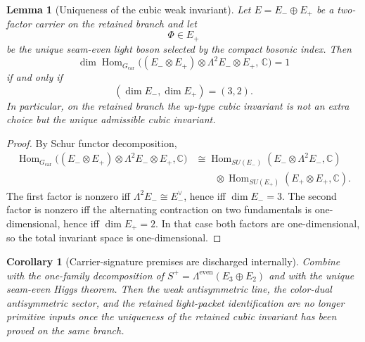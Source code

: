 \documentclass[11pt,a4paper]{article}
\newtheorem{corollary}[theorem]{Corollary}
\newtheorem{lemma}[theorem]{Lemma}
\theoremstyle{definition}
\theoremstyle{remark}
\begin{document}
\begin{lemma}[Uniqueness of the cubic weak invariant]
\label{lem:unique-cubic-weak-invariant}
Let $E=E_-\oplus E_+$ be a two-factor carrier on the retained branch and let
\[
\Phi\in E_+
\]
be the unique seam-even light boson selected by the compact bosonic index. Then
\[
\dim \operatorname{Hom}_{G_{\mathrm{car}}}\bigl((E_-\otimes E_+)\otimes \Lambda^2 E_-\otimes E_+,\,\mathbb C\bigr)=1
\]
if and only if
\[
(\dim E_-,\dim E_+)=(3,2).
\]
In particular, on the retained branch the up-type cubic invariant is not an extra choice but the
unique admissible cubic invariant.
\end{lemma}

\begin{proof}
By Schur functor decomposition,
\[
\begin{aligned}
\operatorname{Hom}_{G_{\mathrm{car}}}\bigl((E_-\otimes E_+)\otimes \Lambda^2 E_-\otimes E_+,\mathbb C\bigr)
&\cong
\operatorname{Hom}_{SU(E_-)}(E_-\otimes \Lambda^2E_-,\mathbb C)
\\
&\qquad\otimes
\operatorname{Hom}_{SU(E_+)}(E_+\otimes E_+,\mathbb C).
\end{aligned}
\]
The first factor is nonzero iff $\Lambda^2E_-\cong E_-^\vee$, hence iff $\dim E_-=3$. The second
factor is nonzero iff the alternating contraction on two fundamentals is one-dimensional, hence iff
$\dim E_+=2$. In that case both factors are one-dimensional, so the total invariant space is
one-dimensional.
\end{proof}

\begin{corollary}[Carrier-signature premises are discharged internally]
\label{cor:yukawa-discharges-kpp}
Combine  with the
one-family decomposition of
$S^+=\Lambda^{\mathrm{even}}(E_3\oplus E_2)$ and with the unique seam-even Higgs theorem. Then the
weak antisymmetric line, the color-dual antisymmetric sector, and the retained light-packet
identification are no longer primitive inputs once the uniqueness of the retained cubic invariant
has been proved on the same branch.
\end{corollary}
\end{document}
